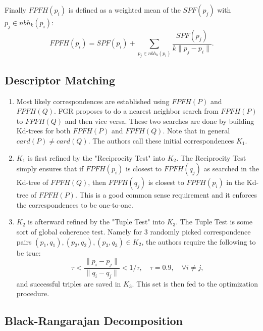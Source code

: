 \documentclass[10pt,a4paper]{article}
\begin{document}
Finally $FPFH(p_i)$ is defined as a weighted mean of the $SPF(p_j)$ with $p_j \in nbh_k(p_i)$:
\begin{equation}
FPFH(p_i) = SPF(p_i) +  \sum_{p_j \in nbh_k(p_i)} \frac{SPF(p_j)}{k\|p_j - p_i\|}.
\end{equation}   

\subsection{Descriptor Matching}
\begin{enumerate}
	\item Most likely correspondences are established using $FPFH(P)$ and $FPFH(Q)$. FGR proposes to do a nearest neighbor search from $FPFH(P)$ to $FPFH(Q)$ and then vice versa. These two searches are done by building Kd-trees for both $FPFH(P)$ and $FPFH(Q)$. Note that in general $card(P) \neq card(Q)$. The authors call these initial correspondences $K_1$. 
	
	\item $K_1$ is first refined by the "Reciprocity Test" into $K_2$. The Reciprocity Test simply ensures that if $FPFH(p_i)$ is closest to $FPFH(q_j)$ as searched in the Kd-tree of $FPFH(Q)$, then $FPFH(q_j)$ is closest to $FPFH(p_i)$ in the Kd-tree of $FPFH(P)$. This is a good common sense requirement and it enforces the correspondences to be one-to-one. 
	
	\item $K_2$ is afterward refined by the "Tuple Test" into $K_3$. The Tuple Test is some sort of global coherence test. Namely for 3 randomly picked correspondence pairs  $(p_1,q_1), (p_2,q_2),(p_3,q_3) \in K_2$, the authors require the following to be true:
	\begin{equation}
	\tau < \frac{\|p_i-p_j\|}{\|q_i - q_j\|} < 1/\tau, \quad \tau = 0.9, \quad \forall i \neq j,
	\end{equation}
	and successful triples are saved in $K_3$. This set is then fed to the optimization procedure. 
\end{enumerate}

\subsection{Black-Rangarajan Decomposition}
\end{document}

